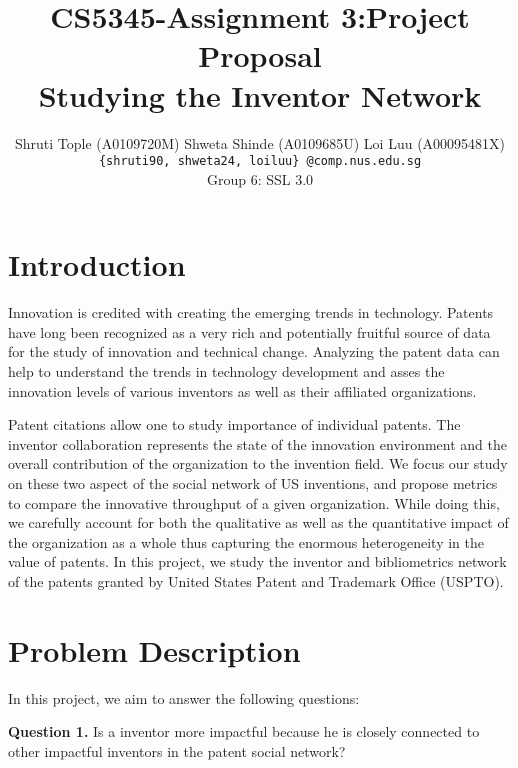 \documentclass[11pt]{article}
\renewcommand{\paragraph}{\vspace{3pt}\noindent\textbf}
\begin{document}
\title{
\vspace{-6ex}
\textbf{CS5345-Assignment 3:Project Proposal}
\\ Studying the Inventor Network \vspace{-0.4cm}}
\author{Shruti Tople {\footnotesize (A0109720M)} \qquad Shweta Shinde {\footnotesize(A0109685U)} \qquad Loi Luu {\footnotesize(A00095481X)}\\ \texttt{\{shruti90, shweta24, loiluu\}~@comp.nus.edu.sg} \\
Group 6: SSL 3.0
}
\date{}

\maketitle
\pagestyle{empty}
\thispagestyle{empty}

\section{Introduction}

Innovation is credited with creating the emerging trends in technology. Patents have long been recognized as a very rich and potentially fruitful source of data for the study of innovation and technical change. Analyzing the patent data can help to understand the trends in technology development and asses the innovation levels of various inventors as well as their affiliated organizations. 

Patent citations allow one to study importance of individual patents. The inventor collaboration represents the state of the innovation environment and the overall contribution of the organization to the invention field. We focus our study on these two aspect of the social network of US inventions, and propose metrics to compare the innovative throughput of a given organization. While doing this, we carefully account for both the qualitative as well as the quantitative impact of the organization as a whole thus capturing the enormous heterogeneity in the value of patents. In this project, we study the inventor and bibliometrics network of the patents granted by United States Patent and Trademark Office (USPTO).


\section{Problem Description} 
In this project, we aim to answer the following questions:

\paragraph{Question 1.} Is a inventor more impactful because he is closely connected to other impactful inventors in the patent social network? %
\end{document}
